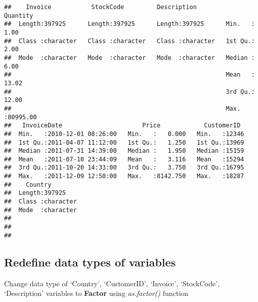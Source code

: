 \documentclass[
]{article}
\newenvironment{Shaded}{\begin{snugshade}}{\end{snugshade}}
\newcommand{\KeywordTok}[1]{\textcolor[rgb]{0.13,0.29,0.53}{\textbf{#1}}}
\newcommand{\NormalTok}[1]{#1}
\newcommand{\OperatorTok}[1]{\textcolor[rgb]{0.81,0.36,0.00}{\textbf{#1}}}
\newcommand{\StringTok}[1]{\textcolor[rgb]{0.31,0.60,0.02}{#1}}
\begin{document}
\begin{verbatim}
##    Invoice           StockCode         Description           Quantity       
##  Length:397925      Length:397925      Length:397925      Min.   :    1.00  
##  Class :character   Class :character   Class :character   1st Qu.:    2.00  
##  Mode  :character   Mode  :character   Mode  :character   Median :    6.00  
##                                                           Mean   :   13.02  
##                                                           3rd Qu.:   12.00  
##                                                           Max.   :80995.00  
##   InvoiceDate                      Price            CustomerID   
##  Min.   :2010-12-01 08:26:00   Min.   :   0.000   Min.   :12346  
##  1st Qu.:2011-04-07 11:12:00   1st Qu.:   1.250   1st Qu.:13969  
##  Median :2011-07-31 14:39:00   Median :   1.950   Median :15159  
##  Mean   :2011-07-10 23:44:09   Mean   :   3.116   Mean   :15294  
##  3rd Qu.:2011-10-20 14:33:00   3rd Qu.:   3.750   3rd Qu.:16795  
##  Max.   :2011-12-09 12:50:00   Max.   :8142.750   Max.   :18287  
##    Country         
##  Length:397925     
##  Class :character  
##  Mode  :character  
##                    
##                    
## 
\end{verbatim}

\hypertarget{redefine-data-types-of-variables}{%
\subsection{Redefine data types of
variables}\label{redefine-data-types-of-variables}}

Change data type of `Country', `CustomerID', `Invoice', `StockCode',
`Description' variables to \textbf{Factor} using \emph{as.factor()}
function

\begin{Shaded}
\end{Shaded}
\end{document}
